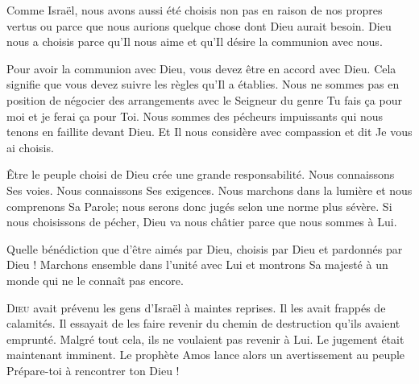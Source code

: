Comme Israël, nous avons aussi été choisis non pas en raison de nos propres
 vertus ou parce que nous aurions quelque chose dont Dieu aurait besoin.
 Dieu nous a choisis parce qu'Il nous aime et qu'Il désire
 la communion avec nous. 


Pour avoir la communion avec Dieu, vous devez être en accord avec Dieu.
 Cela signifie que vous devez suivre les règles qu'Il a établies.
 Nous ne sommes pas en position de négocier des arrangements
 avec le Seigneur du genre\frcolon{}
 \Og Tu fais \c{c}a pour moi et je ferai \c{c}a pour Toi. \Fg{}
 Nous sommes des pécheurs impuissants qui nous tenons en faillite devant Dieu.
 Et Il nous considère avec compassion et dit\frcolon{} 
 \Og Je vous ai choisis. \Fg{}

Être le peuple choisi de Dieu crée une grande responsabilité.
 Nous connaissons Ses voies. Nous connaissons Ses exigences.
 Nous marchons dans la lumière et nous comprenons Sa Parole;
 nous serons donc jugés selon une norme plus sévère.
 Si nous choisissons de pécher, Dieu va nous châtier
 parce que nous sommes à Lui. 

Quelle bénédiction que d'être aimés par Dieu,
 choisis par Dieu et pardonnés par Dieu !
 Marchons ensemble dans l'unité avec Lui et montrons Sa majesté
 à un monde qui ne le connaît pas encore. 

\dvrule






\lettrine{D}{ieu} avait prévenu les gens d'Israël à maintes reprises.
 Il les avait frappés de calamités. Il essayait de les faire revenir
 du chemin de destruction qu'ils avaient emprunté.
 Malgré tout cela, ils ne voulaient pas revenir à Lui.
 Le jugement était maintenant imminent.
 Le prophète Amos lance alors un avertissement au peuple\frcolon{}
 \Og Prépare-toi à rencontrer ton Dieu ! \Fg{}

